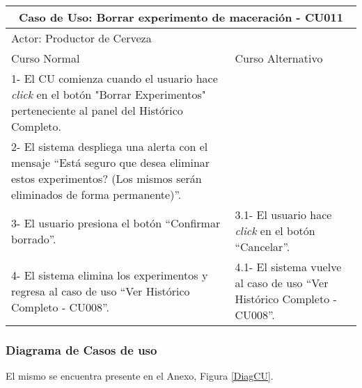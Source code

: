     
    \begin{minipage}{0.95\textwidth}
    \begin{center}
    \begin{tabularx}{\textwidth}{ | X | X |}
        \hline
        \multicolumn{2}{|c|}{\textbf{Caso de Uso: Borrar experimento de maceración - CU011}} \\
        \hline
        \multicolumn{2}{|l|}{Actor: Productor de Cerveza} \\
        \hline
        Curso Normal & Curso Alternativo \\
        \hline
        1- El CU comienza cuando el usuario hace \textit{click} en el botón "Borrar Experimentos" perteneciente al panel del Histórico Completo. & \\
        \hline
        2- El sistema despliega una alerta con el mensaje “Está seguro que desea eliminar estos experimentos? (Los mismos serán eliminados de forma permanente)”. &
        \\
        \hline
        3- El usuario presiona el botón “Confirmar borrado”. & 3.1- El usuario hace \textit{click} en el botón “Cancelar”.
        \\
        \hline
        4- El sistema elimina los experimentos y regresa al caso de uso “Ver Histórico Completo - CU008”. & 4.1- El sistema vuelve al caso de uso “Ver Histórico Completo - CU008”.
        \\
        \hline
    \end{tabularx}
    \label{CU011}
    \end{center}
    \end{minipage}
    
    \subsubsection{Diagrama de Casos de uso}
    El mismo se encuentra presente en el Anexo, Figura \ref{DiagCU}.

	
    
    
    
    

    